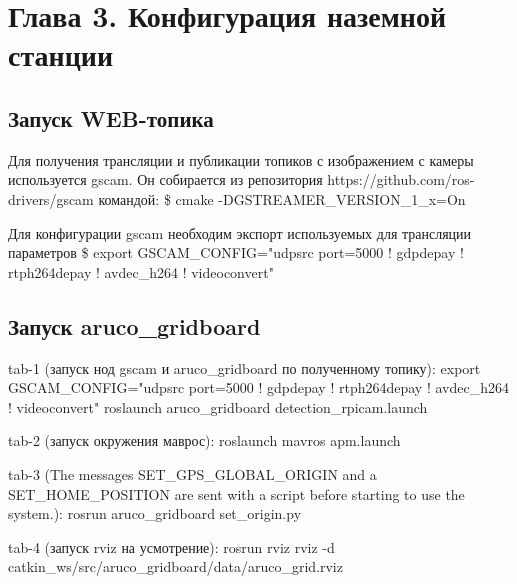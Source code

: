 
\section{Глава 3. Конфигурация наземной станции}

\subsection{Запуск WEB-топика}
Для получения трансляции и публикации топиков с изображением с камеры используется gscam. Он собирается из репозитория https://github.com/ros-drivers/gscam командой:
\$ cmake -DGSTREAMER\_VERSION\_1\_x=On

Для конфигурации gscam необходим экспорт используемых для трансляции параметров \$ export GSCAM\_CONFIG="udpsrc port=5000 ! gdpdepay ! rtph264depay ! avdec\_h264 ! videoconvert"



\subsection{Запуск aruco\_gridboard}
tab-1 (запуск нод gscam и aruco\_gridboard по полученному топику): 
export GSCAM_CONFIG="udpsrc port=5000 ! gdpdepay ! rtph264depay ! avdec_h264 ! videoconvert"
roslaunch aruco_gridboard detection_rpicam.launch

tab-2 (запуск окружения маврос): roslaunch mavros apm.launch

tab-3 (The messages SET_GPS_GLOBAL_ORIGIN and a SET_HOME_POSITION are sent with a script before starting to use the system.): rosrun aruco_gridboard set_origin.py

tab-4 (запуск rviz на усмотрение): rosrun rviz rviz -d catkin_ws/src/aruco_gridboard/data/aruco_grid.rviz

